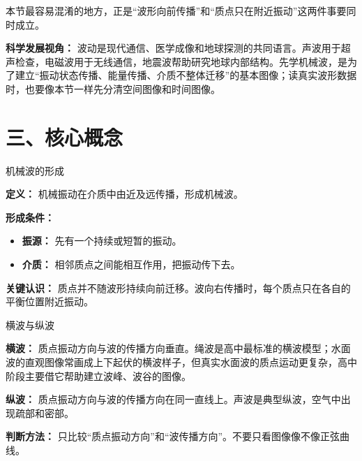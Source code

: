 本节最容易混淆的地方，正是“波形向前传播”和“质点只在附近振动”这两件事要同时成立。

\textbf{科学发展视角：} 波动是现代通信、医学成像和地球探测的共同语言。声波用于超声检查，电磁波用于无线通信，地震波帮助研究地球内部结构。先学机械波，是为了建立“振动状态传播、能量传播、介质不整体迁移”的基本图像；读真实波形数据时，也要像本节一样先分清空间图像和时间图像。

\section*{三、核心概念}

\begin{conceptbox}{机械波的形成}

\textbf{定义：} 机械振动在介质中由近及远传播，形成机械波。

\textbf{形成条件：}
\begin{itemize}
  \item \textbf{振源：} 先有一个持续或短暂的振动。
  \item \textbf{介质：} 相邻质点之间能相互作用，把振动传下去。
\end{itemize}

\begin{center}


\label{fig:wave-transverse-formation}
\end{center}

\textbf{关键认识：} 质点并不随波形持续向前迁移。波向右传播时，每个质点只在各自的平衡位置附近振动。

\end{conceptbox}

\begin{conceptbox}{横波与纵波}

\textbf{横波：} 质点振动方向与波的传播方向垂直。绳波是高中最标准的横波模型；水面波的直观图像常画成上下起伏的横波样子，但真实水面波的质点运动更复杂，高中阶段主要借它帮助建立波峰、波谷的图像。

\textbf{纵波：} 质点振动方向与波的传播方向在同一直线上。声波是典型纵波，空气中出现疏部和密部。

\begin{center}


\label{fig:wave-longitudinal-density}
\end{center}

\textbf{判断方法：} 只比较“质点振动方向”和“波传播方向”。不要只看图像像不像正弦曲线。

\end{conceptbox}

